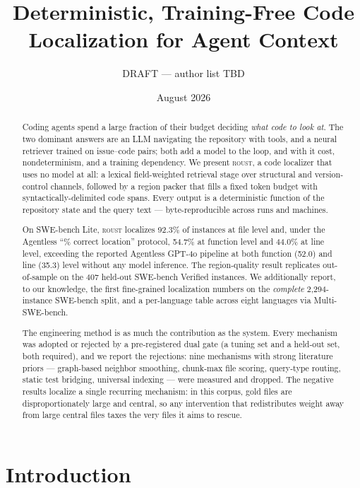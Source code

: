 \documentclass[11pt]{article}
\title{Deterministic, Training-Free Code Localization for Agent Context}
\author{DRAFT --- author list TBD}
\date{August 2026}
\begin{document}
\maketitle

\begin{abstract}
Coding agents spend a large fraction of their budget deciding \emph{what code
to look at}. The two dominant answers are an LLM navigating the repository
with tools, and a neural retriever trained on issue--code pairs; both add a
model to the loop, and with it cost, nondeterminism, and a training
dependency. We present \textsc{roust}, a code localizer that uses no model at
all: a lexical field-weighted retrieval stage over structural and
version-control channels, followed by a region packer that fills a fixed token
budget with syntactically-delimited code spans. Every output is a
deterministic function of the repository state and the query text ---
byte-reproducible across runs and machines.

On SWE-bench Lite, \textsc{roust} localizes 92.3\% of instances at file level
and, under the Agentless ``\% correct location'' protocol, 54.7\% at function
level and 44.0\% at line level, exceeding the reported Agentless GPT-4o
pipeline at both function (52.0) and line (35.3) level without any model
inference. The region-quality result replicates out-of-sample on the 407
held-out SWE-bench Verified instances. We additionally report, to our
knowledge, the first fine-grained localization numbers on the \emph{complete}
2{,}294-instance SWE-bench split, and a per-language table across eight
languages via Multi-SWE-bench.

The engineering method is as much the contribution as the system. Every
mechanism was adopted or rejected by a pre-registered dual gate (a tuning set
and a held-out set, both required), and we report the rejections: nine
mechanisms with strong literature priors --- graph-based neighbor smoothing,
chunk-max file scoring, query-type routing, static test bridging, universal
indexing --- were measured and dropped. The negative results localize a
single recurring mechanism: in this corpus, gold files are disproportionately
large and central, so any intervention that redistributes weight away from
large central files taxes the very files it aims to rescue.
\end{abstract}

\section{Introduction}
\label{sec:intro}
\end{document}
